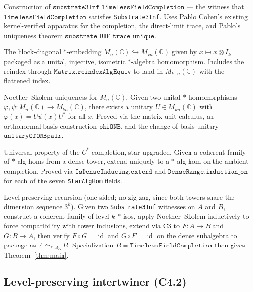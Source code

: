 \documentclass[11pt,a4paper]{article}
\theoremstyle{plain}
\theoremstyle{definition}
\begin{document}
\begin{description}[leftmargin=2em]
  \item[Arc W (5 cards):] Construction of $\texttt{substrate3Inf\_TimelessFieldCompletion}$ --- the witness that $\texttt{TimelessFieldCompletion}$ satisfies \texttt{Substrate3Inf}. Uses Pablo Cohen's existing kernel-verified apparatus for the completion, the direct-limit trace, and Pablo's uniqueness theorem $\texttt{substrate\_UHF\_trace\_unique}$.
  \item[Arc C1 (7 cards):] The block-diagonal $\ast$-embedding $M_n(\mathbb{C}) \hookrightarrow M_{kn}(\mathbb{C})$ given by $x \mapsto x \otimes I_k$, packaged as a unital, injective, isometric $\ast$-algebra homomorphism. Includes the reindex through $\texttt{Matrix.reindexAlgEquiv}$ to land in $M_{k \cdot n}(\mathbb{C})$ with the flattened index.
  \item[Arc C2 (12 cards):] Noether--Skolem uniqueness for $M_n(\mathbb{C})$. Given two unital $\ast$-homomorphisms $\varphi, \psi : M_n(\mathbb{C}) \to M_{kn}(\mathbb{C})$, there exists a unitary $U \in M_{kn}(\mathbb{C})$ with $\varphi(x) = U \psi(x) U^{\ast}$ for all $x$. Proved via the matrix-unit calculus, an orthonormal-basis construction $\texttt{phiONB}$, and the change-of-basis unitary $\texttt{unitaryOfONBpair}$.
  \item[Arc C3 (5 cards):] Universal property of the $C^{\ast}$-completion, star-upgraded. Given a coherent family of $\ast$-alg-homs from a dense tower, extend uniquely to a $\ast$-alg-hom on the ambient completion. Proved via $\texttt{IsDenseInducing.extend}$ and $\texttt{DenseRange.induction\_on}$ for each of the seven \texttt{StarAlgHom} fields.
  \item[Arc C4 (11 cards + main):] Level-preserving recursion (one-sided; no zig-zag, since both towers share the dimension sequence $3^k$). Given two \texttt{Substrate3Inf} witnesses on $A$ and $B$, construct a coherent family of level-$k$ $\ast$-isos, apply Noether--Skolem inductively to force compatibility with tower inclusions, extend via C3 to $F: A \to B$ and $G: B \to A$, then verify $F \circ G = \operatorname{id}$ and $G \circ F = \operatorname{id}$ on the dense subalgebra to package as $A \simeq_{\ast\text{-alg}} B$. Specialization $B = \texttt{TimelessFieldCompletion}$ then gives Theorem~\ref{thm:main}.
\end{description}

\subsection{Level-preserving intertwiner (C4.2)}
\label{sec:c42}
\end{document}
